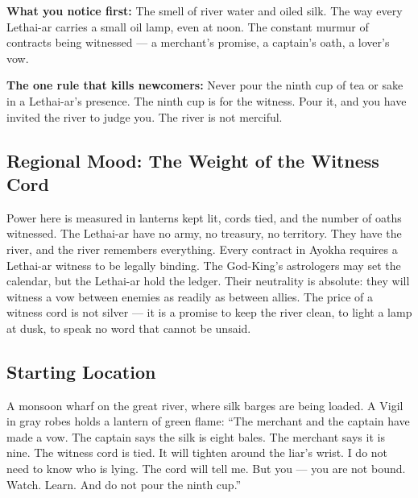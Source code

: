 \vspace{1em}

\begin{tcolorbox}[colback=black!3,colframe=blue!60!black,title={Theme \& Atmosphere},breakable]
\textbf{What you notice first:} The smell of river water and oiled silk. The way every Lethai-ar carries a small oil lamp, even at noon. The constant murmur of contracts being witnessed --- a merchant's promise, a captain's oath, a lover's vow.

\textbf{The one rule that kills newcomers:} Never pour the ninth cup of tea or sake in a Lethai-ar's presence. The ninth cup is for the witness. Pour it, and you have invited the river to judge you. The river is not merciful.
\end{tcolorbox}

\subsection*{Regional Mood: The Weight of the Witness Cord}

Power here is measured in lanterns kept lit, cords tied, and the number of oaths witnessed. The Lethai-ar have no army, no treasury, no territory. They have the river, and the river remembers everything. Every contract in Ayokha requires a Lethai-ar witness to be legally binding. The God-King's astrologers may set the calendar, but the Lethai-ar hold the ledger. Their neutrality is absolute: they will witness a vow between enemies as readily as between allies. The price of a witness cord is not silver --- it is a promise to keep the river clean, to light a lamp at dusk, to speak no word that cannot be unsaid.

\subsection*{Starting Location}

A monsoon wharf on the great river, where silk barges are being loaded. A Vigil in gray robes holds a lantern of green flame: ``The merchant and the captain have made a vow. The captain says the silk is eight bales. The merchant says it is nine. The witness cord is tied. It will tighten around the liar's wrist. I do not need to know who is lying. The cord will tell me. But you --- you are not bound. Watch. Learn. And do not pour the ninth cup.''

